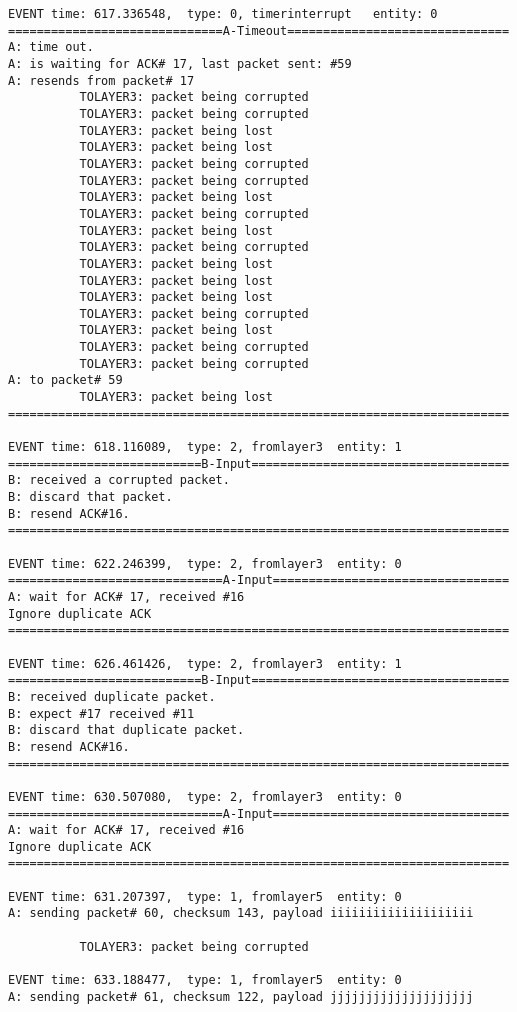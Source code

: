 \documentclass[12pt]{article}
\begin{document}
\begin{verbatim}
EVENT time: 617.336548,  type: 0, timerinterrupt   entity: 0
==============================A-Timeout===============================
A: time out. 
A: is waiting for ACK# 17, last packet sent: #59
A: resends from packet# 17 
          TOLAYER3: packet being corrupted
          TOLAYER3: packet being corrupted
          TOLAYER3: packet being lost
          TOLAYER3: packet being lost
          TOLAYER3: packet being corrupted
          TOLAYER3: packet being corrupted
          TOLAYER3: packet being lost
          TOLAYER3: packet being corrupted
          TOLAYER3: packet being lost
          TOLAYER3: packet being corrupted
          TOLAYER3: packet being lost
          TOLAYER3: packet being lost
          TOLAYER3: packet being lost
          TOLAYER3: packet being corrupted
          TOLAYER3: packet being lost
          TOLAYER3: packet being corrupted
          TOLAYER3: packet being corrupted
A: to packet# 59
          TOLAYER3: packet being lost
======================================================================

EVENT time: 618.116089,  type: 2, fromlayer3  entity: 1
===========================B-Input====================================
B: received a corrupted packet.
B: discard that packet.
B: resend ACK#16.
======================================================================

EVENT time: 622.246399,  type: 2, fromlayer3  entity: 0
==============================A-Input=================================
A: wait for ACK# 17, received #16
Ignore duplicate ACK
======================================================================

EVENT time: 626.461426,  type: 2, fromlayer3  entity: 1
===========================B-Input====================================
B: received duplicate packet.
B: expect #17 received #11
B: discard that duplicate packet.
B: resend ACK#16.
======================================================================

EVENT time: 630.507080,  type: 2, fromlayer3  entity: 0
==============================A-Input=================================
A: wait for ACK# 17, received #16
Ignore duplicate ACK
======================================================================

EVENT time: 631.207397,  type: 1, fromlayer5  entity: 0
A: sending packet# 60, checksum 143, payload iiiiiiiiiiiiiiiiiiii

          TOLAYER3: packet being corrupted

EVENT time: 633.188477,  type: 1, fromlayer5  entity: 0
A: sending packet# 61, checksum 122, payload jjjjjjjjjjjjjjjjjjjj



\end{verbatim}
\end{document}
